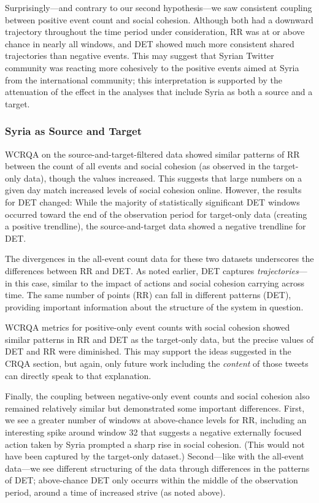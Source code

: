 \documentclass[
  english,
  man]{apa6}
\begin{document}
Surprisingly---and contrary to our second hypothesis---we saw consistent
coupling between positive event count and social cohesion. Although both had a
downward trajectory throughout the time period under consideration, RR was at or
above chance in nearly all windows, and DET showed much more consistent shared
trajectories than negative events. This may suggest that Syrian Twitter
community was reacting more cohesively to the positive events aimed at Syria
from the international community; this interpretation is supported by the
attenuation of the effect in the analyses that include Syria as both a source
and a target.

\hypertarget{syria-as-source-and-target-3}{%
\subsubsection{Syria as Source and Target}\label{syria-as-source-and-target-3}}

WCRQA on the source-and-target-filtered data showed similar patterns of RR
between the count of all events and social cohesion (as observed in the
target-only data), though the values increased. This suggests that large numbers
on a given day match increased levels of social cohesion online. However, the
results for DET changed: While the majority of statistically significant DET
windows occurred toward the end of the observation period for target-only data
(creating a positive trendline), the source-and-target data showed a negative
trendline for DET.

The divergences in the all-event count data for these two datasets underscores
the differences between RR and DET. As noted earlier, DET captures
\emph{trajectories}---in this case, similar to the impact of actions and social
cohesion carrying across time. The same number of points (RR) can fall in
different patterns (DET), providing important information about the structure of
the system in question.

WCRQA metrics for positive-only event counts with social cohesion showed similar
patterns in RR and DET as the target-only data, but the precise values of DET
and RR were diminished. This may support the ideas suggested in the CRQA
section, but again, only future work including the \emph{content} of those tweets can
directly speak to that explanation.

Finally, the coupling between negative-only event counts and social cohesion
also remained relatively similar but demonstrated some important differences.
First, we see a greater number of windows at above-chance levels for RR,
including an interesting spike around window 32 that suggests a negative
externally focused action taken by Syria prompted a sharp rise in social
cohesion. (This would not have been captured by the target-only dataset.)
Second---like with the all-event data---we see different structuring of the data
through differences in the patterns of DET; above-chance DET only occurrs within
the middle of the observation period, around a time of increased strive (as
noted above).
\end{document}
